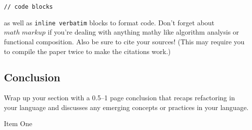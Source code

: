 \documentclass{article}
\begin{document}
\begin{verbatim}
// code blocks
\end{verbatim}

as well as \verb!inline verbatim! blocks to format code. Don't forget about $math \; markup$ if you're dealing with anything mathy like algorithm analysis or functional composition. Also be sure to cite your sources! (This may require you to compile the paper twice to make the citations work\cite{Item1}.)

\subsection*{Conclusion}

Wrap up your section with a 0.5--1 page conclusion that recaps refactoring in your language and discusses any emerging concepts or practices in your language.

\begin{thebibliography}{9}
 Item One
\end{thebibliography}
\end{document}
